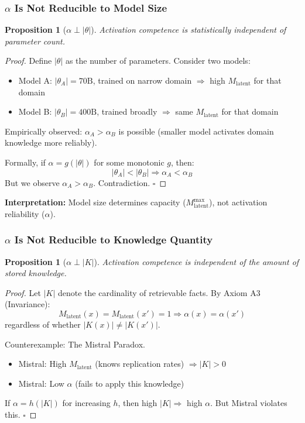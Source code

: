 \documentclass[11pt,a4paper]{article}
\newtheorem{proposition}[theorem]{Proposition}
\begin{document}
\subsubsection{$\alpha$ Is Not Reducible to Model Size}

\begin{proposition}[$\alpha \perp |\theta|$]
Activation competence is statistically independent of parameter count.
\end{proposition}

\begin{proof}
Define $|\theta|$ as the number of parameters. Consider two models:
\begin{itemize}
    \item Model A: $|\theta_A| = 70\text{B}$, trained on narrow domain $\Rightarrow$ high $M_{\text{latent}}$ for that domain
    \item Model B: $|\theta_B| = 400\text{B}$, trained broadly $\Rightarrow$ same $M_{\text{latent}}$ for that domain
\end{itemize}

Empirically observed: $\alpha_A > \alpha_B$ is possible (smaller model activates domain knowledge more reliably).

Formally, if $\alpha = g(|\theta|)$ for some monotonic $g$, then:
\[
|\theta_A| < |\theta_B| \Rightarrow \alpha_A < \alpha_B
\]
But we observe $\alpha_A > \alpha_B$. Contradiction. $\square$
\end{proof}

\textbf{Interpretation:} Model size determines capacity ($M_{\text{latent}}^{\max}$), not activation reliability ($\alpha$).


\subsubsection{$\alpha$ Is Not Reducible to Knowledge Quantity}

\begin{proposition}[$\alpha \perp |K|$]
Activation competence is independent of the amount of stored knowledge.
\end{proposition}

\begin{proof}
Let $|K|$ denote the cardinality of retrievable facts. By Axiom A3 (Invariance):
\[
M_{\text{latent}}(x) = M_{\text{latent}}(x') = 1 \Rightarrow \alpha(x) = \alpha(x')
\]
regardless of whether $|K(x)| \neq |K(x')|$.

Counterexample: The Mistral Paradox.
\begin{itemize}
    \item Mistral: High $M_{\text{latent}}$ (knows replication rates) $\Rightarrow |K| > 0$
    \item Mistral: Low $\alpha$ (fails to apply this knowledge)
\end{itemize}

If $\alpha = h(|K|)$ for increasing $h$, then high $|K| \Rightarrow$ high $\alpha$. But Mistral violates this. $\square$
\end{proof}
\end{document}

